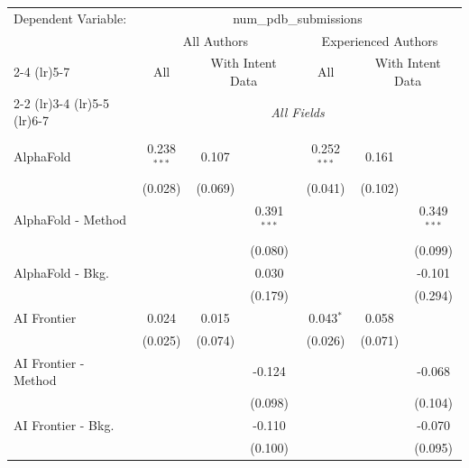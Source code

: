 \begingroup
\centering
\begin{tabular}{lcccccc}
   \tabularnewline \midrule \midrule
   Dependent Variable: & \multicolumn{6}{c}{num\_pdb\_submissions}\\
 & \multicolumn{3}{c}{All Authors} & \multicolumn{3}{c}{Experienced Authors} \\
\cmidrule(lr){2-4} \cmidrule(lr){5-7}
 & \multicolumn{1}{c}{All} & \multicolumn{2}{c}{With Intent Data} & \multicolumn{1}{c}{All} & \multicolumn{2}{c}{With Intent Data} \\
\cmidrule(lr){2-2} \cmidrule(lr){3-4} \cmidrule(lr){5-5} \cmidrule(lr){6-7}
 & \multicolumn{6}{c}{\textit{All Fields}} \\ \\
   AlphaFold            & 0.238$^{***}$ & 0.107          &               & 0.252$^{***}$ & 0.161          &   \\   
                        & (0.028)       & (0.069)        &               & (0.041)       & (0.102)        &   \\   
   AlphaFold - Method   &               &                & 0.391$^{***}$ &               &                & 0.349$^{***}$\\   
                        &               &                & (0.080)       &               &                & (0.099)\\   
   AlphaFold - Bkg.     &               &                & 0.030         &               &                & -0.101\\   
                        &               &                & (0.179)       &               &                & (0.294)\\   
   AI Frontier          & 0.024         & 0.015          &               & 0.043$^{*}$   & 0.058          &   \\   
                        & (0.025)       & (0.074)        &               & (0.026)       & (0.071)        &   \\   
   AI Frontier - Method &               &                & -0.124        &               &                & -0.068\\   
                        &               &                & (0.098)       &               &                & (0.104)\\   
   AI Frontier - Bkg.   &               &                & -0.110        &               &                & -0.070\\   
                        &               &                & (0.100)       &               &                & (0.095)\\   

\end{tabular}
